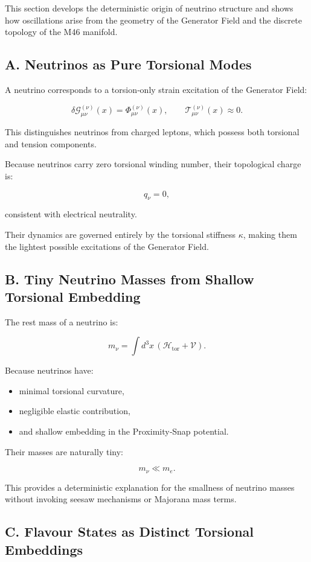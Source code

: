 \documentclass[reprint,amsmath,amssymb,aps,prl,floatfix]{revtex4-2}
\begin{document}
This section develops the deterministic origin of neutrino structure and shows how oscillations arise from the geometry of the Generator Field and the discrete topology of the M46 manifold.

\subsection{A. Neutrinos as Pure Torsional Modes}

A neutrino corresponds to a torsion‑only strain excitation of the Generator Field:

\[
\delta\mathcal{G}_{\mu\nu}^{(\nu)}(x)
=
\Phi_{\mu\nu}^{(\nu)}(x),
\qquad
\mathcal{T}_{\mu\nu}^{(\nu)}(x) \approx 0.
\]

This distinguishes neutrinos from charged leptons, which possess both torsional and tension components.
\medskip

Because neutrinos carry zero torsional winding number, their topological charge is:

\[
q_\nu = 0,
\]

consistent with electrical neutrality.
\medskip

Their dynamics are governed entirely by the torsional stiffness \(\kappa\), making them the lightest possible excitations of the Generator Field.

\subsection{B. Tiny Neutrino Masses from Shallow Torsional Embedding}

The rest mass of a neutrino is:

\[
m_\nu = \int d^3x\,
\left(
\mathcal{H}_{\mathrm{tor}}
+
\mathcal{V}
\right).
\]

Because neutrinos have:
\begin{itemize}
\item minimal torsional curvature,  
\item negligible elastic contribution,  
\item and shallow embedding in the Proximity‑Snap potential.
\end{itemize}

Their masses are naturally tiny:

\[
m_\nu \ll m_e.
\]

This provides a deterministic explanation for the smallness of neutrino masses without invoking seesaw mechanisms or Majorana mass terms.

\subsection{C. Flavour States as Distinct Torsional Embeddings}
\end{document}
